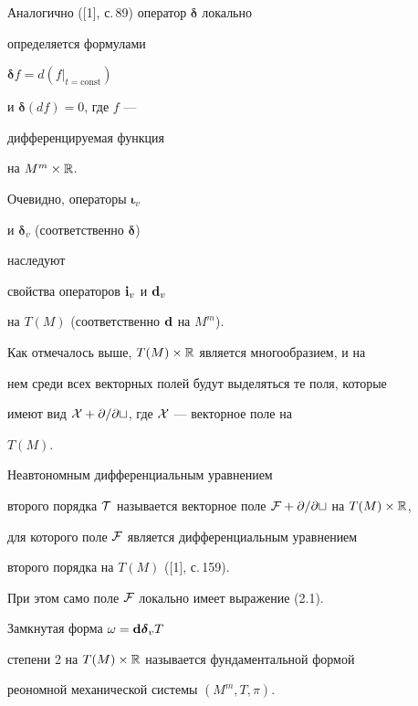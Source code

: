  


Аналогично ([1], с.\,89) оператор $\boldsymbol \delta$ локально


определяется формулами 


$\boldsymbol \delta f=d(f\big|_{t=\text{const}})$


и $\boldsymbol \delta(d f)=0$, где $f$ --- 


дифференцируемая функция 


на $M^m\times\Bbb R$. 


 


Очевидно, операторы $\boldsymbol \iota_v$


и $\boldsymbol \delta_v$ (соответственно $\boldsymbol \delta$) 


наследуют 


свойства операторов $\bold i_v$ и $\bold d_v$


на $T(M)$ (соответственно $\bold d$ на $M^m$). 


 


Как отмечалось выше, $T(M)\times\Bbb R$ является многообразием, и на 


нем среди всех векторных полей будут выделяться те поля, которые 


имеют вид $\cal X+\partial/\partial t$, где $\cal X$ --- векторное поле на 


$T(M)$. 


 


\begin{defn} 


Неавтономным дифференциальным уравнением 


второго порядка $\cal T$ называется векторное поле $\cal 


F+\partial/\partial t$ на $T(M)\times\Bbb R$, 


для которого поле $\cal F$ является дифференциальным уравнением 


второго порядка на $T(M)$ ([1], с.\,159). 


 


При этом само поле $\cal F$ локально имеет выражение (2.1). 


\end{defn} 


 


\begin{defn} 


Замкнутая форма $\omega=\bold d\boldsymbol \delta_v T$ 


степени 2 на $T(M)\times\Bbb R$ называется фундаментальной формой 


реономной механической системы $(M^m,T,\pi)$. 


\end{defn} 


